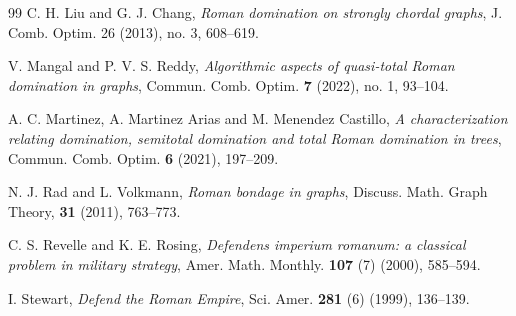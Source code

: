 \documentclass[12pt,reqno]{amsart}
\theoremstyle{plain}
\numberwithin{equation}{section}
\begin{document}
\begin{thebibliography}{99}
 C. H. Liu and G. J. Chang, \emph{Roman domination on strongly chordal graphs}, J. Comb. Optim. 26 (2013), no. 3, 608--619.

 V. Mangal and P. V. S. Reddy, \emph{Algorithmic aspects of quasi-total Roman domination in graphs}, Commun. Comb. Optim. \textbf{7} (2022), no. 1, 93--104.

 A. C. Martinez, A. Martinez Arias and M. Menendez Castillo, \emph{A characterization relating domination, semitotal domination and total Roman domination in trees}, Commun. Comb. Optim. \textbf{6} (2021), 197--209.

 N. J. Rad and L. Volkmann, \emph{Roman bondage in graphs},
Discuss. Math. Graph Theory, \textbf{31} (2011), 763--773.

 C. S. Revelle and K. E. Rosing, \emph{Defendens imperium
romanum: a classical problem in military strategy}, Amer. Math. Monthly.
\textbf{107} (7) (2000), 585--594.

 I. Stewart, \emph{Defend the Roman Empire}, Sci. Amer. \textbf{281} (6) (1999), 136--139.
\end{thebibliography}


\end{document}
